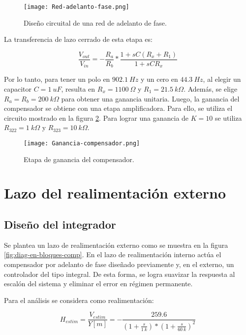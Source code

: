 \begin{figure}[H]
	\centering
	\texttt{[image: Red-adelanto-fase.png]}
	\caption{Diseño circuital de una red de adelanto de fase.}
	\label{fig:red-adelanto-fase}
\end{figure}

\noindent La transferencia de lazo cerrado de esta etapa es:

\begin{equation} 
	\frac{V_{out}}{V_{in}}= - \frac{R_a}{R_b}*\frac{1+sC(R_x+R_1)}{1+sCR_x}
\end{equation}

\noindent Por lo tanto, para tener un polo en $902.1\:Hz$ y un cero en $44.3\:Hz$, al elegir un capacitor $C = 1\:uF$, resulta en $R_x = 1100\:\Omega$ y $R_1 = 21.5\:k\Omega$. Además, se elige $R_a = R_b = 200\:k\Omega$ para obtener una ganancia unitaria. Luego, la ganancia del compensador se obtiene con una etapa amplificadora.
Para ello, se utiliza el circuito mostrado en la figura \ref{fig:ganancia-compensador}. Para lograr una ganancia de $K=10$ se utiliza $R_{322} = 1\:k\Omega$ y $R_{323} = 10\:k\Omega$.


\begin{figure}[H]
	\centering
	\texttt{[image: Ganancia-compensador.png]}
	\caption{Etapa de ganancia del compensador.}
	\label{fig:ganancia-compensador}
\end{figure}

\section{Lazo del realimentación externo}
\subsection{Diseño del integrador}

\noindent Se plantea un lazo de realimentaci\'{o}n externo como se muestra en la  figura \ref{fig:diag-en-bloques-comp}. En el lazo de realimentaci\'{o}n interno act\'{u}a el compensador por adelanto de fase dise\~{n}ado previamente y, en el externo, un controlador del tipo integral. De esta forma, se logra suavizar la respuesta al escal\'{o}n del sistema y eliminar el error en r\'{e}gimen permanente.


\noindent Para el an\'{a}lisis se considera como realimentaci\'{o}n: 

\[H_{estim}=\frac{V_{estim}}{Y[m]}= - \frac{259.6}{(1 + \frac{s}{1\:k})*(1+\frac{s}{60\:k})^2}\] 

